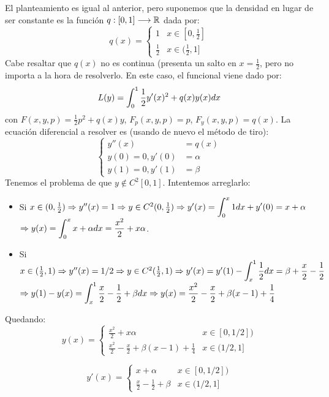 El planteamiento es igual al anterior, pero suponemos que la densidad en lugar de ser constante es la función $q : [0,1] \longrightarrow \mathbb{R}$ dada por:
\[
q(x)=\left\{\begin{array}{cc}
1 & x \in[0,\frac{1}{2}] \\
\frac{1}{2} & x \in(\frac{1}{2}, 1] 
\end{array}
\right.
\]
Cabe resaltar que $q(x)$ no es continua (presenta un salto en $x=\frac{1}{2}$, pero no importa a la hora de resolverlo. En este caso, el funcional viene dado por:
\[
L(y)=\displaystyle\int_{ 0 }^{ 1 } \frac{1}{2}y'(x)^2+q(x)y(x)dx
\]
con $F(x,y,p)=\frac{1}{2}p^2+q(x)y$, $F_p(x,y,p)=p$, $F_y(x,y,p)=q(x)$. La ecuación diferencial a resolver es (usando de nuevo el método de tiro):
\[
\left\{
\begin{array}{rl}
y''(x) & = q(x) \\
y(0)  = 0,y'(0) & = \alpha \\
y(1)= 0, y'(1) & = \beta
\end{array}
\right.
\]
Tenemos el problema de que $y\notin C^2[0,1]$. Intentemos arreglarlo:
\begin{itemize}
\item Si $x\in(0,\frac{1}{2}) \Rightarrow y''(x)=1 \Rightarrow y\in C^2(0,\frac{1}{2}) \Rightarrow y'(x)=\displaystyle\int_{ 0 }^{ x } 1dx+y'(0)=x+\alpha$\\
 $\Rightarrow y(x)=\displaystyle\int_{ 0 }^{ x } x+\alpha dx=\frac{x^2}{2}+x\alpha$.
\item Si $x\in(\frac{1}{2},1) \Rightarrow y''(x)=1/2 \Rightarrow y\in C^2(\frac{1}{2},1) \Rightarrow y'(x)=y'(1)-\displaystyle\int_{ x }^{ 1 } \frac{1}{2}dx=\beta+\frac{x}{2}-\frac{1}{2}$\\
$\Rightarrow y(1)-y(x)=\displaystyle\int_{ x }^{ 1 } \frac{x}{2}-\frac{1}{2}+\beta dx\Rightarrow y(x)=\frac{x^2}{2}-\frac{x}{2}+\beta(x-1)+\frac{1}{4}$
\end{itemize}
Quedando:
\begin{equation}\label{y}
y(x)=\left\{
\begin{array}{cc}
\frac{x^2}{2}+x\alpha & x\in[0,1/2]) \\
\frac{x^2}{2}-\frac{x}{2}+\beta(x-1)+\frac{1}{4} & x\in(1/2,1]
\end{array}
\right.
\end{equation}

\begin{equation}\label{yprima}
y'(x)=\left\{
\begin{array}{cc}
x+\alpha & x\in[0,1/2]) \\
\frac{x}{2}-\frac{1}{2}+\beta & x\in(1/2,1]
\end{array}
\right.
\end{equation}

